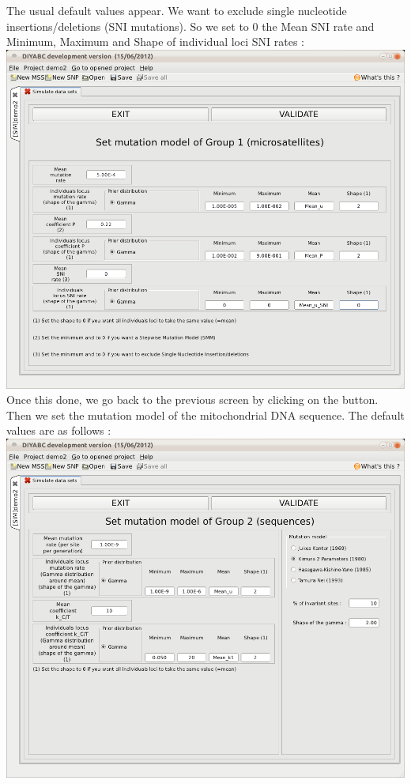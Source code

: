 The usual default values appear. We want to exclude single nucleotide
insertions/deletions (SNI mutations). So we set to 0 the Mean SNI
rate and Minimum, Maximum and Shape of individual loci SNI rates :\\


\includegraphics[scale=0.33]{gui_pictures/Capture-DIYABC-81} \\


Once this done, we go back to the previous screen by clicking on the
 button. Then we set the mutation model
of the mitochondrial DNA sequence. The default values are as follows
:\\


\includegraphics[scale=0.33]{gui_pictures/Capture-DIYABC-82} \\


